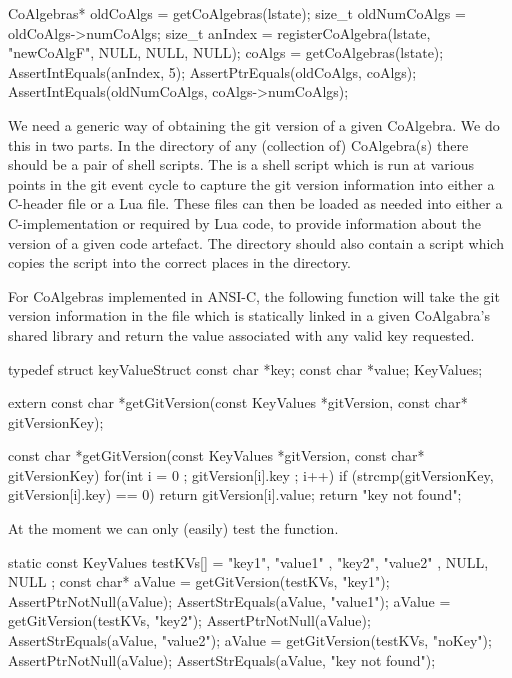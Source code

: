 \startCTest
  CoAlgebras* oldCoAlgs = getCoAlgebras(lstate);
  size_t oldNumCoAlgs = oldCoAlgs->numCoAlgs;
  size_t anIndex = 
    registerCoAlgebra(lstate, "newCoAlgF", NULL, NULL, NULL);
  coAlgs = getCoAlgebras(lstate);
  AssertIntEquals(anIndex, 5);
  AssertPtrEquals(oldCoAlgs, coAlgs);
  AssertIntEquals(oldNumCoAlgs, coAlgs->numCoAlgs);
\stopCTest
\stopTestCase
\stopTestSuite

\startTestSuite[getGitVersion]

We need a generic way of obtaining the git version of a given CoAlgebra. 
We do this in two parts. In the  directory of any (collection 
of) CoAlgebra(s) there should be a pair of shell scripts. The 
 is a  shell script which is run at various 
points in the git event cycle to capture the git version information into 
either a C-header file or a Lua file. These files can then be loaded as 
needed into either a C-implementation or required by Lua code, to provide 
information about the version of a given code artefact. The  
directory should also contain a   script 
which copies the  script into the correct places in the 
 directory. 

For CoAlgebras implemented in ANSI-C, the following function will take the 
git version information in the  file which is 
statically linked in a given CoAlgabra's shared library and return the 
value associated with any valid key requested. 

\startCHeader
typedef struct keyValueStruct {
  const char *key;
  const char *value;
} KeyValues;

extern const char *getGitVersion(const KeyValues *gitVersion, 
                                 const char* gitVersionKey);
\stopCHeader

\startCCode
const char *getGitVersion(const KeyValues *gitVersion,
                          const char* gitVersionKey) {
  for(int i = 0 ; gitVersion[i].key ; i++) {
    if (strcmp(gitVersionKey, gitVersion[i].key) == 0) {
      return gitVersion[i].value;
    }
  }
  return "key not found";
}
\stopCCode

At the moment we can only (easily) test the  function.

\startCTest
  static const KeyValues testKVs[] = {
    { "key1", "value1" },
    { "key2", "value2" },
    { NULL,   NULL }
  };
  const char* aValue = getGitVersion(testKVs, "key1");
  AssertPtrNotNull(aValue);
  AssertStrEquals(aValue, "value1");
  aValue = getGitVersion(testKVs, "key2");
  AssertPtrNotNull(aValue);
  AssertStrEquals(aValue, "value2");
  aValue = getGitVersion(testKVs, "noKey");
  AssertPtrNotNull(aValue);
  AssertStrEquals(aValue, "key not found");
\stopCTest
\stopTestCase
\stopTestSuite

